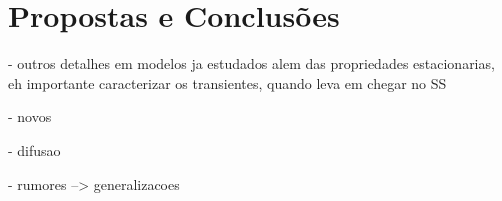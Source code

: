 \documentclass[a4paper,11pt]{report}
\begin{document}
%
%
%
%
%
%
%
%
%
%
%
%
%
%

\chapter{Propostas e Conclus\~oes}
\label{chap:conc}

- outros detalhes em modelos ja estudados
alem das propriedades estacionarias, eh importante caracterizar 
os transientes, quando leva em chegar no SS 

- novos

- difusao

- rumores --> generalizacoes


\clearpage
{}
{}


\end{document}
